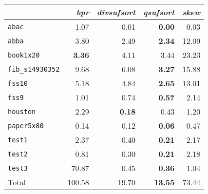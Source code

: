 \begin{tabular}{l r r r r } \toprule
 & \emph{bpr} & \emph{divsufsort} & \emph{qsufsort} & \emph{skew}\\ \midrule
\texttt{abac} & 1.07 & 0.01 & \textbf{0.00} & 0.03\\
\texttt{abba} & 3.80 & 2.49 & \textbf{2.34} & 12.09\\
\texttt{book1x20} & \textbf{3.36} & 4.11 & 3.44 & 23.23\\
\texttt{fib\_s14930352} & 9.68 & 6.08 & \textbf{3.27} & 15.88\\
\texttt{fss10} & 5.18 & 4.84 & \textbf{2.65} & 13.01\\
\texttt{fss9} & 1.01 & 0.74 & \textbf{0.57} & 2.14\\
\texttt{houston} & 2.29 & \textbf{0.18} & 0.43 & 1.20\\
\texttt{paper5x80} & 0.14 & 0.12 & \textbf{0.06} & 0.47\\
\texttt{test1} & 2.37 & 0.40 & \textbf{0.21} & 2.17\\
\texttt{test2} & 0.81 & 0.30 & \textbf{0.21} & 2.18\\
\texttt{test3} & 70.87 & 0.45 & \textbf{0.36} & 1.04\\
 \midrule
Total & 100.58 & 19.70 & \textbf{13.55} & 73.44\\
 \bottomrule
\end{tabular}
